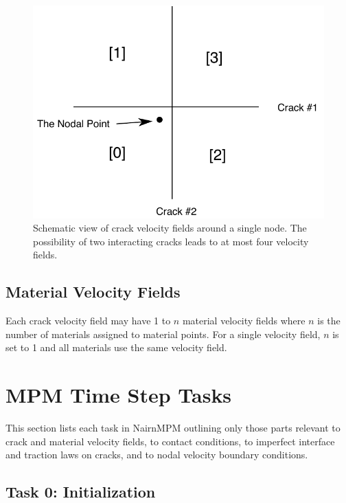 \documentclass[11pt]{article}
\begin{document}
\begin{figure}
\begin{center}
\includegraphics{CrackFields}
\caption{Schematic view of crack velocity fields around a single node. The possibility of two interacting cracks leads to at most four velocity fields.}
\label{cvf}
\end{center}
\end{figure}

\subsection{Material Velocity Fields}

Each crack velocity field may have 1 to $n$ material velocity fields where $n$ is the number of materials assigned to material points. For a single velocity field, $n$ is set to 1 and all materials use the same velocity field.

\section{MPM Time Step Tasks}

This section lists each task in NairnMPM outlining only those parts relevant to crack and material velocity fields, to contact conditions, to imperfect interface and traction laws on cracks, and to nodal velocity boundary conditions.

\subsection{Task 0: Initialization}
\end{document}
